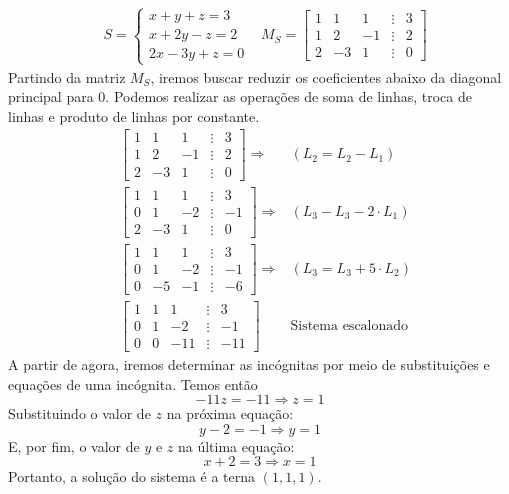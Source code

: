 \begin{exemplo}
\begin{align*}
&S=\begin{cases}
x+y+z=3 \\
x+2y-z=2 \\
2x-3y+z=0
\end{cases} &M_S=\begin{bmatrix}
1 & 1 & 1 & \vdots & 3 \\
1 & 2 & -1 & \vdots & 2 \\
2 & -3 & 1 & \vdots & 0
\end{bmatrix}
\end{align*}
Partindo da matriz $M_S$, iremos buscar reduzir os coeficientes abaixo da diagonal principal para 0. Podemos realizar as operações de soma de linhas, troca de linhas e produto de linhas por constante.
\begin{align*}
&\begin{bmatrix}
1 & 1 & 1 & \vdots & 3 \\
1 & 2 & -1 & \vdots & 2 \\
2 & -3 & 1 & \vdots & 0
\end{bmatrix}\Rightarrow &(L_2=L_2-L_1) \\
&\begin{bmatrix}
1 & 1 & 1 & \vdots & 3 \\
0 & 1 & -2 & \vdots & -1 \\
2 & -3 & 1 & \vdots & 0
\end{bmatrix}\Rightarrow &(L_3-L_3-2\cdot L_1) \\
&\begin{bmatrix}
1 & 1 & 1 & \vdots & 3 \\
0 & 1 & -2 & \vdots & -1 \\
0 & -5 & -1 & \vdots & -6
\end{bmatrix}\Rightarrow &(L_3=L_3+5\cdot L_2) \\
&\begin{bmatrix}
1 & 1 & 1 & \vdots & 3 \\
0 & 1 & -2 & \vdots & -1 \\
0 & 0 & -11 & \vdots & -11
\end{bmatrix} &\text{Sistema escalonado}
\end{align*}
A partir de agora, iremos determinar as incógnitas por meio de substituições e equações de uma incógnita. Temos então
\[-11z=-11 \Rightarrow z=1\]
Substituindo o valor de $z$ na próxima equação:
\[y-2=-1 \Rightarrow y=1\]
E, por fim, o valor de $y$ e $z$ na última equação:
\[x+2=3\Rightarrow x=1\]
Portanto, a solução do sistema é a terna $(1,1,1)$. \\ 

\end{exemplo}
